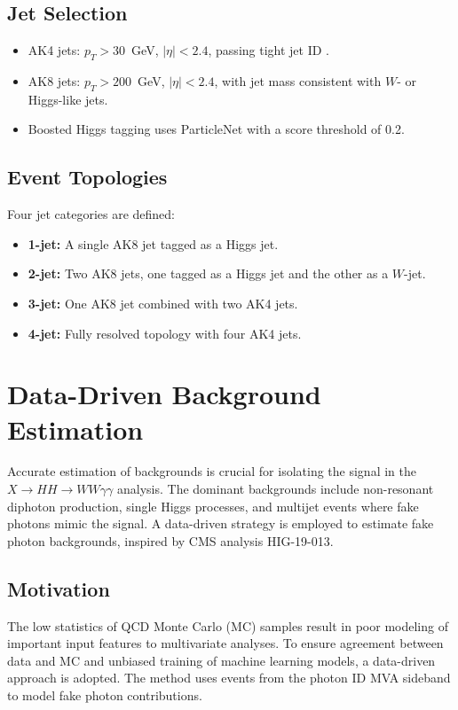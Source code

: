 \subsection*{Jet Selection}
\begin{itemize}
    \item AK4 jets: \(p_T > 30\)~GeV, \(|\eta| < 2.4\), passing tight jet ID .
    \item AK8 jets: \(p_T > 200\)~GeV, \(|\eta| < 2.4\), with jet mass consistent with \(W\)- or Higgs-like jets.
    \item Boosted Higgs tagging uses ParticleNet  with a score threshold of 0.2.
\end{itemize}

\subsection*{Event Topologies}
Four jet categories are defined:
\begin{itemize}
    \item \textbf{1-jet:} A single AK8 jet tagged as a Higgs jet.
    \item \textbf{2-jet:} Two AK8 jets, one tagged as a Higgs jet and the other as a \(W\)-jet.
    \item \textbf{3-jet:} One AK8 jet combined with two AK4 jets.
    \item \textbf{4-jet:} Fully resolved topology with four AK4 jets.
\end{itemize}


\section{Data-Driven Background Estimation}
Accurate estimation of backgrounds is crucial for isolating the signal in the \(X \to HH \to WW\gamma\gamma\) analysis.
The dominant backgrounds include non-resonant diphoton production, single Higgs processes, and multijet events
where fake photons mimic the signal.
A data-driven strategy is employed to estimate fake photon backgrounds, inspired by CMS analysis HIG-19-013.

\subsection{Motivation}
The low statistics of QCD Monte Carlo (MC) samples result in poor modeling of important input features to multivariate analyses. To
ensure agreement between data and MC and unbiased training of machine learning models, a data-driven approach is adopted. The method
uses events from the photon ID MVA sideband to model fake photon contributions.

